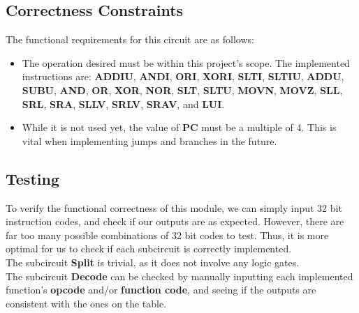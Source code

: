 \documentclass{article}
\begin{document}
\subsection{Correctness Constraints}
The functional requirements for this circuit are as follows:
\begin{itemize}
\item
The operation desired must be within this project's scope. The implemented instructions are: \textbf{ADDIU}, \textbf{ANDI}, \textbf{ORI}, \textbf{XORI}, \textbf{SLTI}, \textbf{SLTIU}, \textbf{ADDU}, \textbf{SUBU}, \textbf{AND}, \textbf{OR}, \textbf{XOR}, \textbf{NOR}, \textbf{SLT}, \textbf{SLTU}, \textbf{MOVN}, \textbf{MOVZ}, \textbf{SLL}, \textbf{SRL}, \textbf{SRA}, \textbf{SLLV}, \textbf{SRLV}, \textbf{SRAV}, and \textbf{LUI}.

\item
While it is not used yet, the value of \textbf{PC} must be a multiple of 4. This is vital when implementing jumps and branches in the future.
\end{itemize}

\subsection{Testing}
To verify the functional correctness of this module, we can simply input 32 bit instruction codes, and check if our outputs are as expected. However, there are far too many possible combinations of 32 bit codes to test. Thus, it is more optimal for us to check if each subcircuit is correctly implemented. \\

\noindent The subcircuit \textbf{Split} is trivial, as it does not involve any logic gates. \\

\noindent The subcircuit \textbf{Decode} can be checked by manually inputting each implemented function's \textbf{opcode} and/or \textbf{function code}, and seeing if the outputs are consistent with the ones on the table. 
\end{document}
